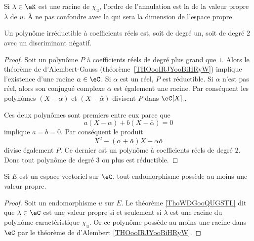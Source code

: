 \begin{definition}
	Si \( \lambda\in\eK\) est une racine de \( \chi_u\), l'ordre de l'annulation est la  de la valeur propre \( \lambda\) de \( u\). À ne pas confondre avec la  qui sera la dimension de l'espace propre.
\end{definition}

\begin{proposition}
	Un polynôme irréductible à coefficients réels est, soit de degré un, soit de degré \( 2\) avec un discriminant négatif.
\end{proposition}

\begin{proof}
	Soit un polynôme \( P\) à coefficients réels de degré plus grand que \( 1\). Alors le théorème de d'Alembert-Gauss (théorème~\ref{THOooIRJYooBiHRyW}) implique l'existence d'une racine \( \alpha \in \eC \). Si \( \alpha\) est un réel, \( P\) est réductible. Si \( \alpha\) n'est pas réel, alors son conjugué complexe \( \bar \alpha\) est également une racine. Par conséquent les polynômes \( (X-\alpha)\) et \( (X-\bar \alpha)\) divisent \( P\) dans \( \eC[X]. \).

	Ces deux polynômes sont premiers entre eux parce que
	\begin{equation}
		a(X-\alpha)+b(X-\bar \alpha)=0
	\end{equation}
	implique \( a=b=0\). Par conséquent le produit
	\begin{equation}
		X^2-(\alpha+\bar \alpha)X+\alpha\bar\alpha
	\end{equation}
	divise également \( P\). Ce dernier est un polynôme à coefficients réels de degré \( 2\). Donc tout polynôme de degré \( 3\) ou plus est réductible.
\end{proof}

\begin{proposition}     \label{PROPooLXGSooXmVcVG}
	Si \( E\) est un espace vectoriel sur \( \eC\), tout endomorphisme possède au moins une valeur propre.
\end{proposition}

\begin{proof}
	Soit un endomorphisme \( u\) sur \( E\). Le théorème \ref{ThoWDGooQUGSTL} dit que \( \lambda\in \eC\) est une valeur propre si et seulement si \( \lambda\) est une racine du polynôme caractéristique \( \chi_u\). Or ce polynôme possède au moins une racine dans \( \eC\) par le théorème de d'Alembert \ref{THOooIRJYooBiHRyW}.
\end{proof}


